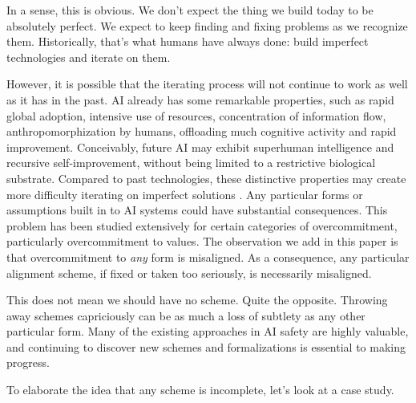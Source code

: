 \documentclass[11pt]{article}
\begin{document}

In a sense, this is obvious. We don't expect the thing we build today to be absolutely perfect. We expect to keep finding and fixing problems as we recognize them. Historically, that's what humans have always done: build imperfect technologies and iterate on them.

However, it is possible that the iterating process will not continue to work as well as it has in the past. AI already has some remarkable properties, such as rapid global adoption, intensive use of resources, concentration of information flow, anthropomorphization by humans, offloading much cognitive activity and rapid improvement. Conceivably, future AI may exhibit superhuman intelligence and recursive self-improvement, without being limited to a restrictive biological substrate. Compared to past technologies, these distinctive properties may create more difficulty iterating on imperfect solutions \citep{bostrom2014superintelligence}. Any particular forms or assumptions built in to AI systems could have substantial consequences. This problem has been studied extensively for certain categories of overcommitment, particularly overcommitment to values. The observation we add in this paper is that overcommitment to \textit{any} form is misaligned. As a consequence, any particular alignment scheme, if fixed or taken too seriously, is necessarily misaligned. 

This does not mean we should have no scheme. Quite the opposite. Throwing away schemes capriciously can be as much a loss of subtlety as any other particular form. Many of the existing approaches in AI safety are highly valuable, and continuing to discover new schemes and formalizations is essential to making progress. 

To elaborate the idea that any scheme is incomplete, let's look at a case study.
\end{document}
